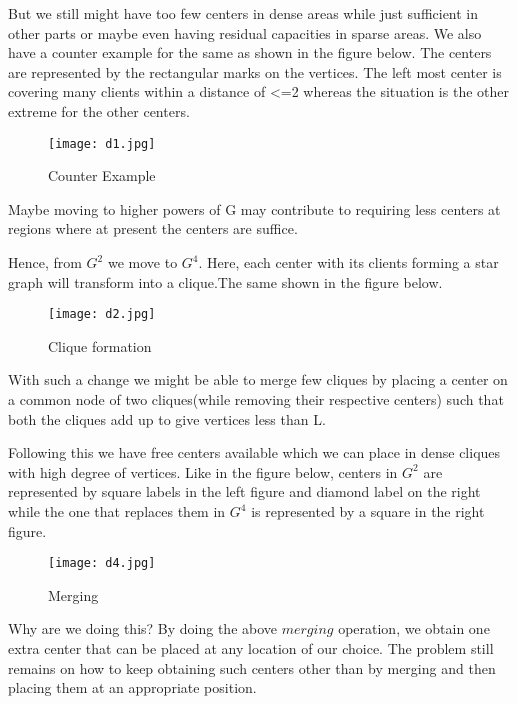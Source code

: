 \documentclass[12pt,a4paper,onecolumn]{article}
\begin{document}
\begin{itemize}
But we still might have too few centers in dense areas while just sufficient in other parts or maybe even having residual capacities in sparse areas. We also have a counter example for the same as shown in the figure below. The centers are represented by the rectangular marks on the vertices. The left most center is covering many clients within a distance of <=2 whereas the situation is the other extreme for the other centers.\\
\begin{figure}[H]
\begin{center}
\texttt{[image: d1.jpg]}
  \caption{Counter Example}
  \label{Figure 12}
\end{center}
\end{figure} Maybe moving to higher powers of G may contribute to requiring less centers at regions where at present the centers are suffice.

Hence, from $G^2$ we move to $G^4$. Here, each center with its clients forming a star graph will transform into a clique.The same shown in the figure below.\begin{figure}[H]
\begin{center}
\texttt{[image: d2.jpg]}
  \caption{Clique formation}
  \label{Figure 10}
\end{center}
\end{figure} With such a change we might be able to merge few cliques by placing a center on a common node of two cliques(while removing their respective centers) such that both the cliques add up to give vertices less than L. 

Following this we have free centers available which we can place in dense cliques with high degree of vertices. Like in the figure below, centers in $G^2$ are represented by square labels in the left figure and diamond label on the right while the one that replaces them in $G^4$ is represented by a square in the right figure.
\begin{figure}[H]
\begin{center}
\texttt{[image: d4.jpg]}
  \caption{Merging}
  \label{Figure 11}
\end{center}
\end{figure}
Why are we doing this? By doing the above $merging$ operation, we obtain one extra center that can be placed at any location of our choice. The problem still remains on how to keep obtaining such centers other than by merging and then placing them at an appropriate position.


\end{itemize}
\end{document}
